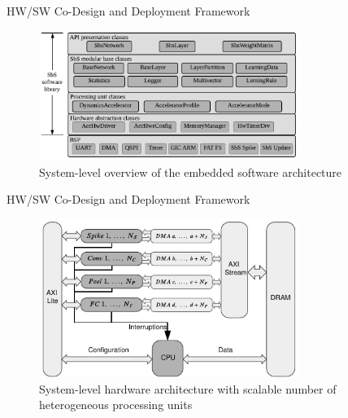 \begin{frame}{HW/SW Co-Design and Deployment Framework}

			\begin{figure}
				\includegraphics[width=0.75\textwidth]{slides/figures/sbs_software_component.pdf}
				\caption{System-level overview of the embedded software architecture}
			\end{figure}

\end{frame}

\begin{frame}{HW/SW Co-Design and Deployment Framework}

			\begin{figure}
				\includegraphics[width=0.75\textwidth]{./slides/figures/sbs_hw.pdf} %
				\caption{System-level hardware architecture with scalable number of heterogeneous processing units}
			\end{figure}

\end{frame}

